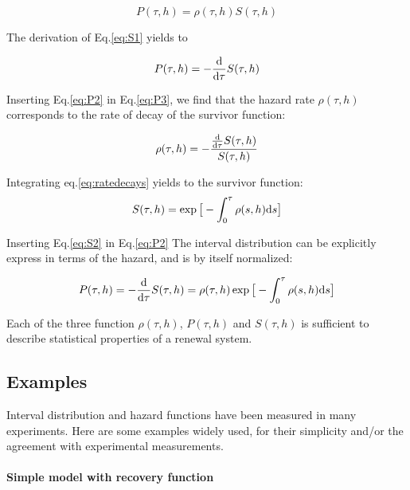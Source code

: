 \documentclass[12pt,twoside]{report}
\def \dd  {{\rm d}}
\begin{document}
\begin{equation}
\label{eq:P2}
P(\tau,h)=\rho(\tau,h)S(\tau,h)
\end{equation}

The derivation of Eq.\eqref{eq:S1} yields to 

\begin{equation}
\label{eq:P3}
P(\tau,h)=-\frac{\dd}{\dd \tau}S(\tau,h)
\end{equation}

Inserting Eq.\eqref{eq:P2} in Eq.\eqref{eq:P3}, we find that the hazard rate $\rho(\tau,h)$ corresponds to the rate of decay of the survivor function:

\begin{equation}
\label{eq:ratedecays}
\rho(\tau,h)=-\frac{\frac{\dd}{\dd \tau}S(\tau,h)}{S(\tau,h)}
\end{equation}

Integrating eq.\ref{eq:ratedecays} yields to the survivor function:
\begin{equation}
\label{eq:S2}
S(\tau,h)=\exp\big[-\int_0^\tau\rho(s,h)\dd s\big]
\end{equation}

Inserting Eq.\eqref{eq:S2} in Eq.\eqref{eq:P2} The interval distribution can be explicitly express in terms of the hazard, and is by itself normalized:

\begin{equation}
\label{eq:P4}
P(\tau,h)=-\frac{\dd}{\dd \tau}S(\tau,h)=\rho(\tau,h)\exp\big[-\int_0^\tau\rho(s,h)\dd s\big]
\end{equation}

Each of the three function $\rho(\tau,h)$, $P(\tau,h)$ and $S(\tau,h)$ is sufficient to describe statistical properties of a renewal system.

\subsection{Examples }


Interval distribution and hazard functions have been measured in many experiments. Here are some examples widely used, for their simplicity and/or the agreement with experimental measurements.

\paragraph{Simple model with recovery function}
\end{document}
